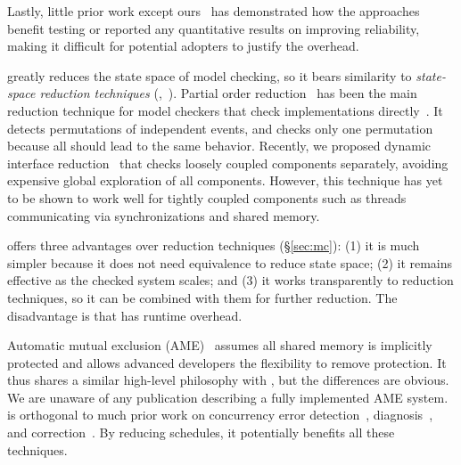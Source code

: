 Lastly, little prior work except ours~\cite{wu:pldi12} has demonstrated how the
approaches benefit testing or reported any quantitative results on
improving reliability, making it difficult for potential adopters to
justify the overhead.

 \xxx greatly reduces the state space of
model checking, so it bears similarity to \emph{state-space reduction
  techniques} (\eg,~\cite{godefroid:verisoft, flanagan:dynamicpo,
  demeter:sosp11}).  Partial order
reduction~\cite{godefroid:verisoft, flanagan:dynamicpo} has been the main
reduction technique for model checkers that check implementations
directly~\cite{modist:nsdi09, dbug:spin11}.  It detects
permutations of independent events, and checks only one permutation
because all should lead to the same behavior.  Recently, we proposed
dynamic interface reduction~\cite{demeter:sosp11} that checks loosely
coupled components separately, avoiding expensive global exploration of
all components.  However, this technique has yet to be shown to work well
for tightly coupled components such as threads communicating
via synchronizations and shared memory.

\xxx offers three advantages over reduction techniques
(\S\ref{sec:mc}): (1) it is much simpler because it does not
need equivalence to reduce state space; (2) it remains effective as the
checked system scales; and (3) it works transparently to reduction
techniques, so it can be combined with them for further reduction.  The
disadvantage is that \xxx has runtime overhead.

 Automatic mutual exclusion (AME)~\cite{ame:hotos07} assumes all shared
memory is implicitly protected and allows advanced developers the
flexibility to remove protection.  It thus shares a similar high-level
philosophy with \xxx, but the differences are obvious.  We are unaware of
any publication describing a fully implemented AME system. \xxx is
orthogonal to much prior work on concurrency error
detection~\cite{yu:racetrack:sosp,savage:eraser,racerx:sosp03,lu:muvi:sosp,avio:asplos06,conmem:asplos10},
diagnosis~\cite{racefuzzer:pldi08,ctrigger:asplos09,atomfuzzer:fse08}, and
correction~\cite{dimmunix:osdi08,gadara:osdi08,wu:loom:osdi10,cfix:osdi12}. By
reducing schedules, it potentially benefits all these techniques.
